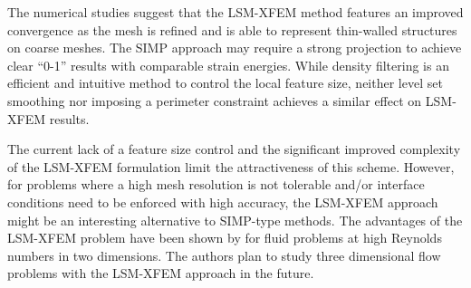 The numerical studies suggest that the LSM-XFEM method features an improved convergence as the mesh is refined and is able to represent thin-walled structures on coarse meshes. The SIMP approach may require a strong projection to achieve clear ``0-1'' results with comparable strain energies. While density filtering is an efficient and intuitive method to control the local feature size, neither level set smoothing nor imposing a perimeter constraint achieves a similar effect on LSM-XFEM results.

The current lack of a feature size control and the significant improved complexity of the LSM-XFEM formulation limit the attractiveness of this scheme. However, for problems where a high mesh resolution is not tolerable and/or interface conditions need to be enforced with high accuracy, the LSM-XFEM approach might be an interesting alternative to SIMP-type methods. The advantages of the LSM-XFEM problem have been shown by \citet{KM:12} for fluid problems at high Reynolds numbers in two dimensions. The authors plan to study three dimensional flow problems with the LSM-XFEM approach in the future.


% 


% 
% 

% 
